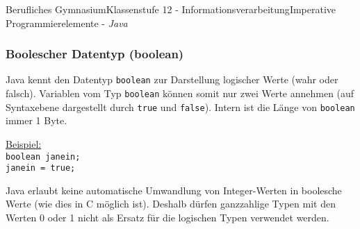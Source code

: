 \documentclass[oneside,openany,headings=optiontotoc,11pt,numbers=noenddot]{article}
\begin{document}
\begin{worksheet}{Berufliches Gymnasium}{Klassenstufe 12 - Informationsverarbeitung}{Imperative Programmierelemente - \textit{Java}}
		\subsubsection{Boolescher Datentyp (boolean)}
		Java kennt den Datentyp \lstinline[style=JavaInputStyle]|boolean| zur Darstellung logischer Werte (wahr oder falsch). Variablen vom Typ \lstinline[style=JavaInputStyle]|boolean| können somit nur zwei Werte annehmen (auf Syntaxebene dargestellt durch \lstinline[style=JavaInputStyle]|true| und \lstinline[style=JavaInputStyle]|false|). Intern ist die Länge von \lstinline[style=JavaInputStyle]|boolean| immer 1 Byte.\\
		\par\noindent
		\underline{Beispiel:}\\
		\lstinline[style=JavaInputStyle]|boolean janein;|\\
		\lstinline[style=JavaInputStyle]|janein = true;|\\
		\par\noindent
		Java erlaubt keine automatische Umwandlung von Integer-Werten in boolesche Werte (wie dies in C möglich ist). Deshalb dürfen ganzzahlige Typen mit den Werten 0 oder 1 nicht als Ersatz für die logischen Typen verwendet werden.

\end{worksheet}
\end{document}
